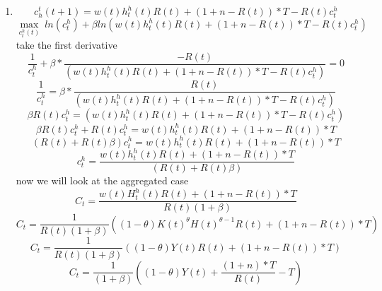 \begin{enumerate}
    \item  
    $$ c^t_h(t+1) = w(t)h^h_t(t)R(t)+(1+n-R(t))*T-R(t)c^h_t$$
    $$\max_{c^h_t(t)} ~ ln(c_t^h)+\beta ln(w(t)h^h_t(t)R(t)+(1+n-R(t))*T-R(t)c^h_t)$$
    take the first derivative 
    $$ \frac{1}{c_t^h}+\beta*\frac{-R(t)}{(w(t)h^h_t(t)R(t)+(1+n-R(t))*T-R(t)c^h_t)}=0$$
    $$ \frac{1}{c_t^h}=\beta*\frac{R(t)}{(w(t)h^h_t(t)R(t)+(1+n-R(t))*T-R(t)c^h_t)}$$
    $$ \beta R(t)c_t^h=(w(t)h^h_t(t)R(t)+(1+n-R(t))*T-R(t)c^h_t)$$
    $$ \beta R(t)c_t^h+R(t)c^h_t=w(t)h^h_t(t)R(t)+(1+n-R(t))*T$$
    $$ (R(t)+R(t)\beta)c^h_t=w(t)h^h_t(t)R(t)+(1+n-R(t))*T$$
    $$ c^h_t=\frac{w(t)h^h_t(t)R(t)+(1+n-R(t))*T}{(R(t)+R(t)\beta)}$$
    now we will look at the aggregated case
    $$ C_t=\frac{w(t)H^h_t(t)R(t)+(1+n-R(t))*T}{R(t)(1+\beta)}$$
    $$ C_t=\frac{1}{R(t)(1+\beta)}((1-\theta)K(t)^{\theta} H(t)^{\theta-1}R(t)+(1+n-R(t))*T)$$
    $$ C_t=\frac{1}{R(t)(1+\beta)}((1-\theta)Y(t)R(t)+(1+n-R(t))*T)$$
     $$ C_t=\frac{1}{(1+\beta)}((1-\theta)Y(t)+\frac{(1+n)*T}{R(t)}-T)$$

\end{enumerate}